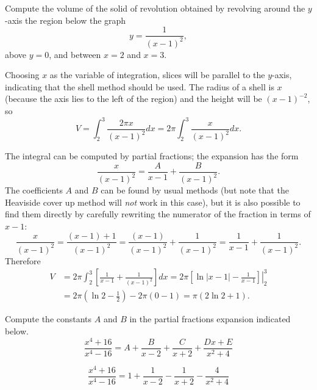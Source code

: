 \documentclass{ximera}
\begin{document}
\begin{question}%
Compute the volume of the solid of revolution obtained by revolving around the $y$-axis the region below the graph
\[ y = \frac{1}{(x-1)^2}, \]
above $y=0$, and between $x=2$ and $x=3$.
\begin{multiplechoice}
\choice{\(\displaystyle \pi\)}
\end{multiplechoice}
\begin{feedback}
Choosing $x$ as the variable of integration, slices will be parallel to the $y$-axis, indicating that the shell method should be used. The radius of a shell is $x$ (because the axis lies to the left of the region) and the height will be $(x-1)^{-2}$, so 
\[ V = \int_2^3 \frac{2 \pi x}{(x-1)^2} dx = 2 \pi \int_2^3 \frac{x}{(x-1)^2} dx. \] \begin{hint}
The integral can be computed by partial fractions; the expansion has the form
\[ \frac{x}{(x-1)^2} = \frac{A}{x-1} + \frac{B}{(x-1)^2}. \]
The coefficients $A$ and $B$ can be found by usual methods (but note that the Heaviside cover up method will \textit{not} work in this case), but it is also possible to find them directly by carefully rewriting the numerator of the fraction in terms of $x-1$:
\[ \frac{x}{(x-1)^2} = \frac{(x-1) + 1}{(x-1)^2} = \frac{(x-1)}{(x-1)^2} + \frac{1}{(x-1)^2} = \frac{1}{x-1} + \frac{1}{(x-1)^2}. \]
Therefore
\[ \begin{aligned} V & = 2 \pi \int_2^3 \left[ \frac{1}{x-1} + \frac{1}{(x-1)^2} \right] dx = 2 \pi \left. \left[ \ln |x-1| - \frac{1}{x-1} \right] \right|_{2}^3 \\
& = 2 \pi \left( \ln 2 - \frac{1}{2} \right) - 2 \pi \left( 0 - 1 \right) = \pi(2 \ln 2 + 1). \end{aligned}\] \end{hint}
\end{feedback}

\end{question}

\begin{question}%

Compute the constants \(A\) and \(B\) in the partial fractions expansion indicated below. 
\[ \frac{x^4 + 16}{x^4 - 16} =A +  \frac{B}{x-2} + \frac{C}{x+2} + \frac{Dx + E}{x^2 + 4} \]
\begin{multiplechoice}
\end{multiplechoice}
\begin{comments}
\[  \frac{x^4 + 16}{x^4 - 16} = 1 + \frac{1}{x-2} - \frac{1}{x+2} - \frac{4}{x^2+4} \]
\end{comments}


\end{question}
\end{document}
